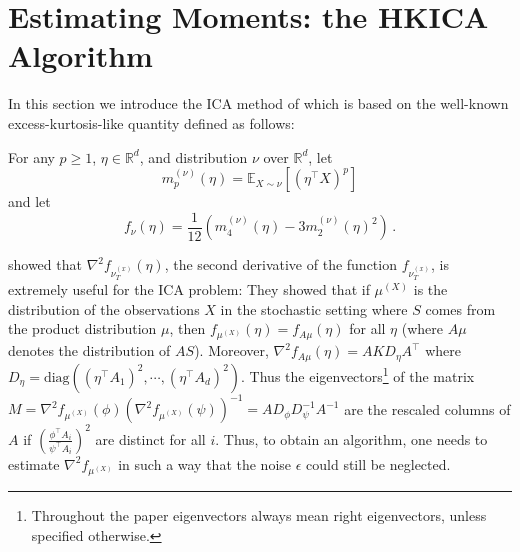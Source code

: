 \documentclass[jmlr]{article}
\newcommand{\E}{\mathbb{E}}
\newcommand{\real}{\mathbb{R}}
\newcommand{\R}{\real}
\theoremstyle{definition}
\begin{document}
\section{Estimating Moments: the HKICA Algorithm}
\label{sec:HKICA}
In this section we introduce the ICA method of \citet{hsu2013learning} which is based on the well-known excess-kurtosis-like quantity
defined as follows:

For any $p\ge 1$, $\eta\in \real^d$, and distribution $\nu$ over $\R^d$,
let 
\begin{equation}
\label{eq:momnent}
m_p^{(\nu)}(\eta) = \E_{X\sim \nu}[ (\eta^\top X)^p ]
\end{equation}
and let
\begin{equation}
\label{eq:funcf}
f_{\nu}(\eta) = \frac1{12} \left( m_4^{(\nu)}(\eta) - 3 m_2^{(\nu)}(\eta)^2 \right)\,.
\end{equation}

\citet{hsu2013learning} showed that $\nabla^2f_{\nu_T^{(x)}}(\eta)$, the second derivative of the function $f_{\nu_T^{(x)}}$, is extremely useful for the ICA problem:
They showed that if $\mu^{(X)}$ is the distribution of the observations $X$ in the stochastic setting where $S$ comes from the product distribution $\mu$, then
$f_{\mu^{(X)}}(\eta)=f_{A\mu}(\eta)$ for all $\eta$ (where $A\mu$ denotes the distribution of $AS$). 
Moreover, $\nabla^2 f_{A\mu}(\eta)=A K D_{\eta} A^\top$ where $D_{\eta}=\text{diag}\left((\eta^{\top}A_1)^2,\cdots, (\eta^{\top}A_d)^2\right)$.
 Thus the eigenvectors\footnote{Throughout the paper eigenvectors always mean right eigenvectors, unless specified otherwise.} of the matrix $M=\nabla^2f_{\mu^{(X)}}(\phi)(\nabla^2f_{\mu^{(X)}}(\psi))^{-1} = AD_{\phi}D_{\psi}^{-1}A^{-1}$ are the rescaled columns of $A$ if $\left(\frac{\phi^\top A_i}{\psi^\top A_i}\right)^2$ are distinct for all $i$. Thus, to obtain an algorithm, one needs to estimate $\nabla^2 f_{\mu^{(X)}}$ in such a way that the noise $\epsilon$ could still be neglected.
\end{document}
